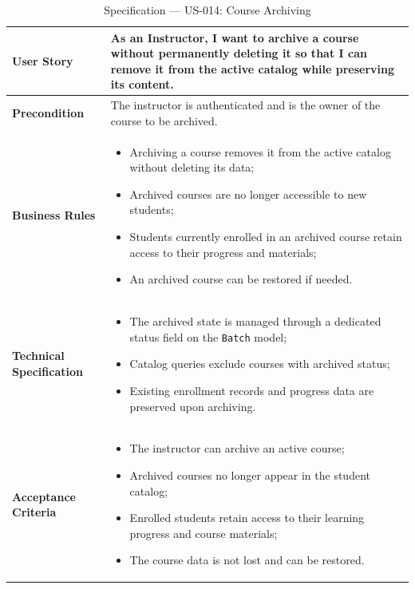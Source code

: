 \begin{table}[H]
\centering
\caption{Specification — US-014: Course Archiving}
\label{tab:us014}
\renewcommand{\arraystretch}{1}
\begin{tabularx}{\textwidth}{|p{2.5cm}|X|}
\hline
\textbf{User Story} & As an Instructor, I want to archive a course without permanently deleting it so that I can remove it from the active catalog while preserving its content. \\
\hline
\textbf{Precondition} & The instructor is authenticated and is the owner of the course to be archived. \\
\hline
\textbf{Business Rules} &
\begin{itemize}
  \item Archiving a course removes it from the active catalog without deleting its data;
  \item Archived courses are no longer accessible to new students;
  \item Students currently enrolled in an archived course retain access to their progress and materials;
  \item An archived course can be restored if needed.
\end{itemize} \\
\hline
\textbf{Technical Specification} &
\begin{itemize}
  \item The archived state is managed through a dedicated status field on the \texttt{Batch} model;
  \item Catalog queries exclude courses with archived status;
  \item Existing enrollment records and progress data are preserved upon archiving.
\end{itemize} \\
\hline
\textbf{Acceptance Criteria} &
\begin{itemize}
  \item The instructor can archive an active course;
  \item Archived courses no longer appear in the student catalog;
  \item Enrolled students retain access to their learning progress and course materials;
  \item The course data is not lost and can be restored.
\end{itemize} \\
\hline
\end{tabularx}
\end{table}

